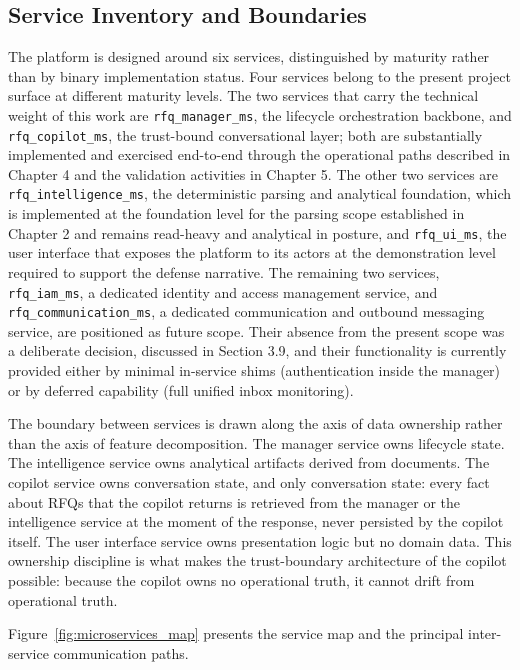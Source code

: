 \subsection*{Service Inventory and Boundaries}
The platform is designed around six services, distinguished by maturity rather than by binary implementation status. Four services belong to the present project surface at different maturity levels. The two services that carry the technical weight of this work are \texttt{rfq\_manager\_ms}, the lifecycle orchestration backbone, and \texttt{rfq\_copilot\_ms}, the trust-bound conversational layer; both are substantially implemented and exercised end-to-end through the operational paths described in Chapter 4 and the validation activities in Chapter 5. The other two services are \texttt{rfq\_intelligence\_ms}, the deterministic parsing and analytical foundation, which is implemented at the foundation level for the parsing scope established in Chapter 2 and remains read-heavy and analytical in posture, and \texttt{rfq\_ui\_ms}, the user interface that exposes the platform to its actors at the demonstration level required to support the defense narrative. The remaining two services, \texttt{rfq\_iam\_ms}, a dedicated identity and access management service, and \texttt{rfq\_communication\_ms}, a dedicated communication and outbound messaging service, are positioned as future scope. Their absence from the present scope was a deliberate decision, discussed in Section 3.9, and their functionality is currently provided either by minimal in-service shims (authentication inside the manager) or by deferred capability (full unified inbox monitoring).

The boundary between services is drawn along the axis of data ownership rather than the axis of feature decomposition. The manager service owns lifecycle state. The intelligence service owns analytical artifacts derived from documents. The copilot service owns conversation state, and only conversation state: every fact about RFQs that the copilot returns is retrieved from the manager or the intelligence service at the moment of the response, never persisted by the copilot itself. The user interface service owns presentation logic but no domain data. This ownership discipline is what makes the trust-boundary architecture of the copilot possible: because the copilot owns no operational truth, it cannot drift from operational truth.

Figure~\ref{fig:microservices_map} presents the service map and the principal inter-service communication paths.

